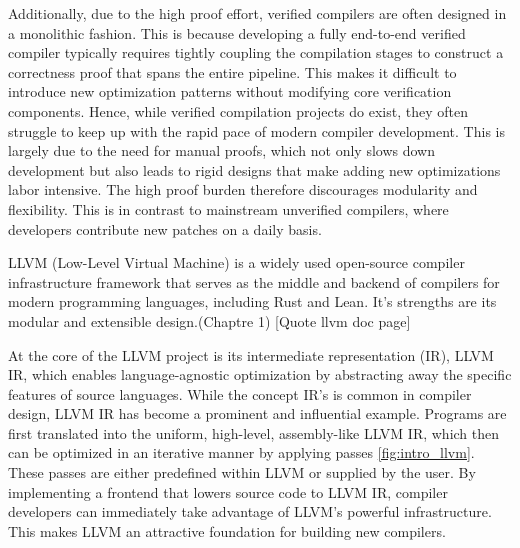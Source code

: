 Additionally, due to the high proof effort, verified compilers are often designed in a monolithic fashion. This is because developing a fully end-to-end verified compiler typically requires tightly coupling the compilation stages to construct a correctness proof that spans the entire pipeline. This makes it difficult to introduce new optimization patterns without modifying core verification components.
Hence, while verified compilation projects do exist, they often struggle to keep up with the rapid pace of modern compiler development. This is largely due to the need for manual proofs, which not only slows down development but also leads to rigid designs that make adding new optimizations labor intensive. The high proof burden therefore discourages modularity and flexibility. This is in contrast to mainstream unverified compilers, where developers contribute new patches on a daily basis.


 LLVM (Low-Level Virtual Machine) is a widely used open-source compiler infrastructure framework that serves as the middle and backend of compilers for modern programming languages, including Rust and Lean. It's strengths are its modular and extensible design.(Chaptre 1) [Quote llvm doc page]

At the core of the LLVM project is its intermediate representation (IR), LLVM IR, which enables language-agnostic optimization by abstracting away the specific features of source languages. While the concept IR's is common in compiler design, LLVM IR has become a prominent and influential example. Programs are first translated into the uniform, high-level, assembly-like LLVM IR, which then can be optimized in an iterative manner by applying passes \ref{fig:intro_llvm}. These passes are either predefined within LLVM or supplied by the user. By implementing a frontend that lowers source code to LLVM IR, compiler developers can immediately take advantage of LLVM's powerful infrastructure. This makes LLVM an attractive foundation for building new compilers.

